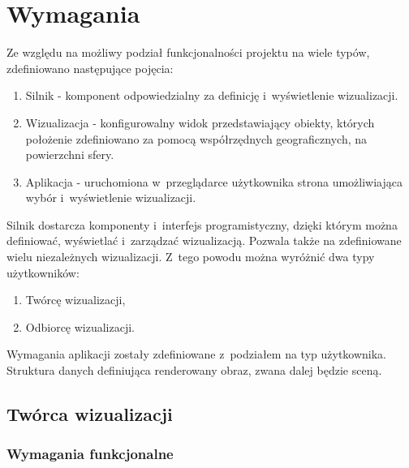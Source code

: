 \chapter{Wymagania}
\label{chap:Requirements}
Ze względu na możliwy podział funkcjonalności projektu na wiele typów, zdefiniowano następujące pojęcia:
\begin{enumerate}
    \item Silnik - komponent odpowiedzialny za definicję i~wyświetlenie wizualizacji.
    \item Wizualizacja - konfigurowalny widok przedstawiający obiekty, których położenie zdefiniowano za pomocą współrzędnych geograficznych, na powierzchni sfery.
    \item Aplikacja - uruchomiona w~przeglądarce użytkownika strona umożliwiająca wybór i~wyświetlenie wizualizacji.
\end{enumerate} 

Silnik dostarcza komponenty i~interfejs programistyczny, dzięki którym można definiować, wyświetlać i~zarządzać wizualizacją.
Pozwala także na zdefiniowane wielu niezależnych wizualizacji. Z~tego powodu można wyróżnić dwa typy użytkowników:

\begin{enumerate}
    \item Twórcę wizualizacji,
    \item Odbiorcę wizualizacji.
\end{enumerate}

Wymagania aplikacji zostały zdefiniowane z~podziałem na typ użytkownika.
Struktura danych definiująca renderowany obraz, zwana dalej będzie sceną.

\newcommand{\req}[3]{
    \stepcounter{#2}
    #1\_\arabic{#2} & #3 \\
    \hline
}

\section{Twórca wizualizacji}

\subsection{Wymagania funkcjonalne}


